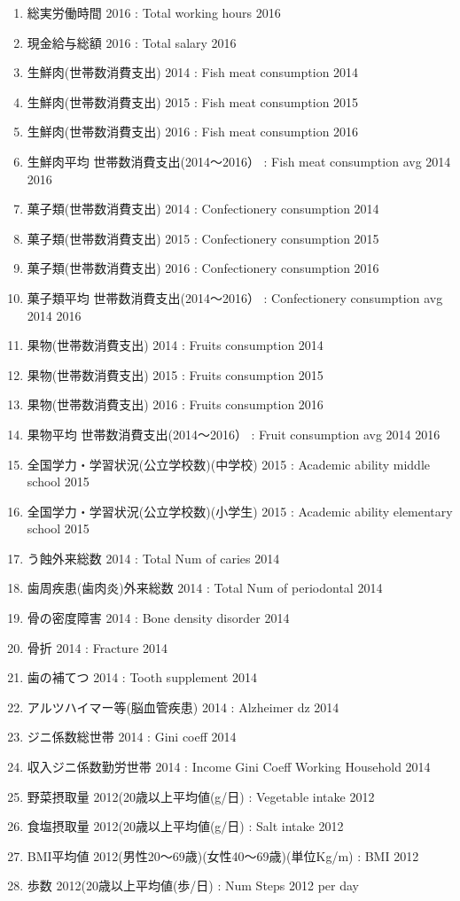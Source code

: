 \begin{multicols}{2}
\begin{enumerate}
  \item 総実労働時間 2016  :  Total working hours 2016
  \item 現金給与総額 2016  :  Total salary 2016
  \item 生鮮肉(世帯数消費支出) 2014  :  Fish meat consumption 2014
  \item 生鮮肉(世帯数消費支出) 2015  :  Fish meat consumption 2015
  \item 生鮮肉(世帯数消費支出) 2016  :  Fish meat consumption 2016
  \item 生鮮肉平均 世帯数消費支出(2014〜2016）  :  Fish meat consumption avg 2014 2016
  \item 菓子類(世帯数消費支出) 2014  :  Confectionery consumption 2014
  \item 菓子類(世帯数消費支出) 2015  :  Confectionery consumption 2015
  \item 菓子類(世帯数消費支出) 2016  :  Confectionery consumption 2016
  \item 菓子類平均 世帯数消費支出(2014〜2016）  :  Confectionery consumption avg 2014 2016
  \item 果物(世帯数消費支出) 2014  :  Fruits consumption 2014
  \item 果物(世帯数消費支出) 2015  :  Fruits consumption 2015
  \item 果物(世帯数消費支出) 2016  :  Fruits consumption 2016
  \item 果物平均 世帯数消費支出(2014〜2016）  :  Fruit consumption avg 2014 2016
  \item 全国学力・学習状況(公立学校数)(中学校) 2015  :  Academic ability middle school 2015
  \item 全国学力・学習状況(公立学校数)(小学生) 2015  :  Academic ability elementary school 2015
  \item う蝕外来総数 2014  :  Total Num of caries 2014
  \item 歯周疾患(歯肉炎)外来総数 2014  :  Total Num of periodontal 2014
  \item 骨の密度障害 2014  :  Bone density disorder 2014
  \item 骨折 2014  :  Fracture 2014
  \item 歯の補てつ 2014  :  Tooth supplement 2014
  \item アルツハイマー等(脳血管疾患) 2014  :  Alzheimer dz 2014
  \item ジニ係数総世帯 2014  :  Gini coeff 2014
  \item 収入ジニ係数勤労世帯 2014  :  Income Gini Coeff Working Household 2014
  \item 野菜摂取量 2012(20歳以上平均値(g/日)  :  Vegetable intake 2012
  \item 食塩摂取量 2012(20歳以上平均値(g/日)  :  Salt intake 2012
  \item BMI平均値 2012(男性20〜69歳)(女性40〜69歳)(単位Kg/m)  :  BMI 2012
  \item 歩数 2012(20歳以上平均値(歩/日)  :  Num Steps 2012 per day
\end{enumerate}


\end{multicols}


